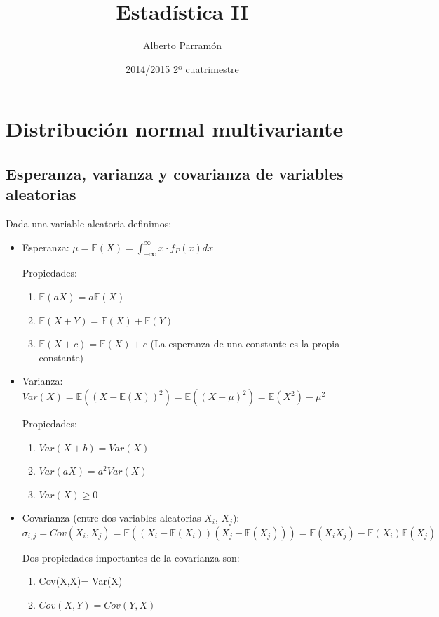 \documentclass[nochap]{apuntes}
\author{Alberto Parramón}
\date{2014/2015 2º cuatrimestre}
\title{Estadística II}
\begin{document}
\pagestyle{plain}
\maketitle

\tableofcontents
\newpage

\chapter{Distribución normal multivariante}

\section{Esperanza, varianza y covarianza de variables aleatorias}
Dada una variable aleatoria definimos:
\begin{itemize}
\item Esperanza: $\mu = \mathbb{E}(X) = \int_{-\infty}^{\infty}x\cdot f_P(x) dx$

Propiedades:
\begin{enumerate}
\item $\mathbb{E}(aX) = a\mathbb{E}(X)$
\item $\mathbb{E}(X+Y) = \mathbb{E}(X)+\mathbb{E}(Y)$
\item $\mathbb{E}(X+c) = \mathbb{E}(X)+c$ (La esperanza de una constante es la propia constante)
\end{enumerate}
\item Varianza: $Var(X) = \mathbb{E}((X-\mathbb{E}(X))^2) =\mathbb{E}((X-\mu)^2) = \mathbb{E}(X^2)-\mu^2$

Propiedades:
\begin{enumerate}
\item $Var(X+b)=Var(X)$
\item $Var(aX)=a^2Var(X)$
\item $Var(X)\geq 0$
\end{enumerate}
\item Covarianza (entre dos variables aleatorias $X_i$, $X_j$): $\sigma_{i,j} = Cov(X_i,X_j) = \mathbb{E}\left((X_i-\mathbb{E}(X_i))(X_j-\mathbb{E}(X_j))\right) = \mathbb{E}(X_i X_j)-\mathbb{E}(X_i)\mathbb{E}(X_j)$

Dos propiedades importantes de la covarianza son:

\begin{enumerate}
\item Cov(X,X)= Var(X)
\item $Cov(X,Y)=Cov(Y,X)$
\end{enumerate}

\end{itemize}
\end{document}
